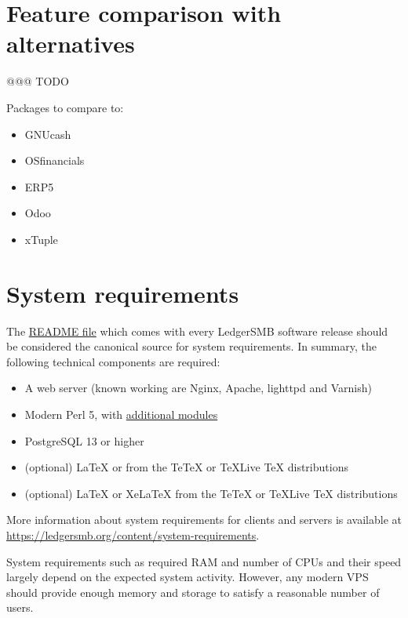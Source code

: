\section{Feature comparison with alternatives}
\label{sec-ledgersmb-feature-comparison}
@@@ TODO

Packages to compare to:

\begin{itemize}
	\item GNUcash
	\item OSfinancials
	\item ERP5
	\item Odoo
	\item xTuple
\end{itemize}



\section{System requirements}
\label{sec-ledgersmb-system-requirements}

The \href{https://github.com/ledgersmb/LedgerSMB/blob/1.10/README.md#system-requirements}{README file}
which comes with every LedgerSMB software release should be
considered the canonical source for system requirements. In summary, the
following technical components are required:

\begin{itemize}
	\item A web server (known working are Nginx, Apache, lighttpd and Varnish)
	\item Modern Perl 5, with \href{https://github.com/ledgersmb/LedgerSMB/blob/1.10/cpanfile}{additional modules}
	\item PostgreSQL 13 or higher
    \ifpdf
	   \item (optional) \LaTeX{} or \XeLaTeX{} from the Te\TeX{} or \TeX{}Live \TeX{} distributions
    \else
    	\item (optional) LaTeX or XeLaTeX from the TeTeX or TeXLive TeX distributions
    \fi
    
\end{itemize}

More information about system requirements for clients and servers is available at
\href{https://ledgersmb.org/content/system-requirements}{https://ledgersmb.org/content/system-requirements}.

System requirements such as required RAM and number of CPUs and their speed
largely depend on the expected system activity. However, any modern \acrshort{VPS} should provide enough memory and storage to satisfy a reasonable number of users.

